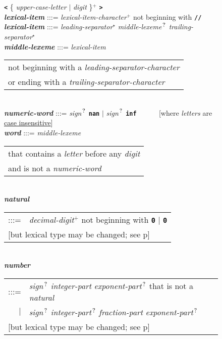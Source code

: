 \documentclass[12pt]{article}
\newcommand{\TT}[1]{{\tt \bfseries #1}}
\newcommand{\STAR}{{\Large $^\star$}}
\newcommand{\PLUS}[1][]{{$^{+#1}$}}
\newcommand{\QMARK}{{$^{\,\mbox{\footnotesize ?}}$}}
\newcommand{\ttkey}[1]{{\tt \bfseries #1}}
\newcommand{\emkey}[1]{{\em \bfseries #1}}
\newcommand{\pagref}[1]{p\pageref{#1}}
\newlength{\figurewidth}
\newenvironment{boxedfigure}[1][!btp]%
	{\begin{figure*}[#1]
	 \begin{lrbox}{\figurebox}
	 \begin{minipage}{\figurewidth}

	 \vspace*{1ex}}%
	{
	 \vspace*{1ex}

	 \end{minipage}
	 \end{lrbox}

	 \centering
	 \fbox{\hspace*{0.1in}\usebox{\figurebox}\hspace*{0.1in}}
	 \end{figure*}}
\begin{document}
\begin{boxedfigure}[!p]
    \TT{<} \{ {\em upper-case-letter} $|$ {\em digit} \}\PLUS{} \TT{>}
\\[1ex]
\emkey{lexical-item} :::= {\em lexical-item-character}\PLUS{}
                       not beginning with \TT{//}
\\[0.5ex]
\emkey{lexical-item} :::= {\em leading-separator}\STAR{}
			  {\em middle-lexeme}\QMARK{}
                          {\em trailing-separator}\STAR{}
\\[0.5ex]
\emkey{middle-lexeme} :::= 
	{\em lexical-item}
	\begin{tabular}[t]{@{}l@{}}
	not beginning with a {\em leading-separator-character} \\
	or ending with a {\em trailing-separator-character} \\
	\end{tabular}
\\[0.5ex]
\emkey{numeric-word} :::= {\em sign}\QMARK{} \ttkey{nan}
                      $|$ {\em sign}\QMARK{} \ttkey{inf}
		      ~~~~~
		      [where {\em letters} are \underline{case insensitive}]
\\[0.5ex]
\emkey{word} :::= {\em middle-lexeme}
                  \begin{tabular}[t]{@{}l@{}}
		  that contains a {\em letter} before any {\em digit} \\
		  and is not a {\em numeric-word}
		  \end{tabular}
\\[0.5ex]
\emkey{natural}\label{NATURAL}
	\begin{tabular}[t]{@{}rl@{}}
	:::= & {\em decimal-digit}\PLUS{} not beginning with \TT{0} $|$
	       \TT{0} \\
	\multicolumn{2}{l}{[but lexical type may be changed;
	                    see \pagref{LEXEME-TYPE-CONVERSION}]} \\
	\end{tabular}
\\[0.5ex]
\emkey{number}\label{NUMBER}
	\begin{tabular}[t]{@{}rl@{}}
	:::= & {\em sign}\QMARK{} {\em integer-part}
	                          {\em exponent-part}\QMARK{}
	     that is not a {\em natural} \\
	 $|$ & {\em sign}\QMARK{} {\em integer-part}\QMARK{}
	                          {\em fraction-part}
				  {\em exponent-part}\QMARK{} \\
	\multicolumn{2}{l}{[but lexical type may be changed;
	                    see \pagref{LEXEME-TYPE-CONVERSION}]} \\

\end{tabular}
\end{boxedfigure}
\end{document}
